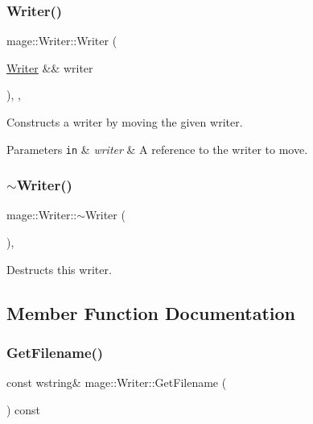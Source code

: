 \subsubsection{\texorpdfstring{Writer()}{Writer()}\hspace{0.1cm}{\footnotesize\ttfamily [3/3]}}
{\footnotesize\ttfamily mage\+::\+Writer\+::\+Writer (\begin{DoxyParamCaption}\item[{\hyperlink{classmage_1_1_writer}{Writer} \&\&}]{writer }\end{DoxyParamCaption})\hspace{0.3cm}{\ttfamily [protected]}, {\ttfamily [default]}, {\ttfamily [noexcept]}}

Constructs a writer by moving the given writer.


\begin{DoxyParams}[1]{Parameters}
\mbox{\tt in}  & {\em writer} & A reference to the writer to move. \\
\hline
\end{DoxyParams}
\hypertarget{classmage_1_1_writer_aeeb30d6afb1a271b4ad294889054caec}{}\label{classmage_1_1_writer_aeeb30d6afb1a271b4ad294889054caec} 
\subsubsection{\texorpdfstring{$\sim$\+Writer()}{~Writer()}}
{\footnotesize\ttfamily mage\+::\+Writer\+::$\sim$\+Writer (\begin{DoxyParamCaption}{ }\end{DoxyParamCaption})\hspace{0.3cm}{\ttfamily [protected]}, {\ttfamily [default]}}

Destructs this writer. 

\subsection{Member Function Documentation}
\hypertarget{classmage_1_1_writer_aedbc8d5fa02444ecba2e040ca8e98281}{}\label{classmage_1_1_writer_aedbc8d5fa02444ecba2e040ca8e98281} 
\subsubsection{\texorpdfstring{Get\+Filename()}{GetFilename()}}
{\footnotesize\ttfamily const wstring\& mage\+::\+Writer\+::\+Get\+Filename (\begin{DoxyParamCaption}{ }\end{DoxyParamCaption}) const\hspace{0.3cm}{\ttfamily [noexcept]}}

